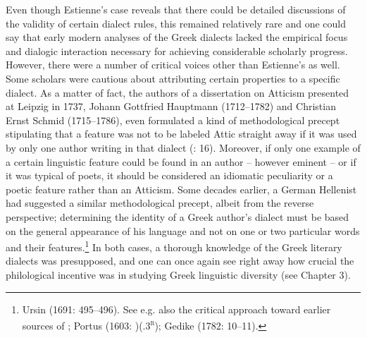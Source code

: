 Even though Estienne’s case reveals that there could be detailed discussions of the validity of certain dialect rules, this remained relatively rare and one could say that early modern analyses of the Greek dialects lacked the empirical focus and dialogic interaction necessary for achieving considerable scholarly progress. However, there were a number of critical voices other than Estienne’s as well. Some scholars were cautious about attributing certain properties to a specific dialect. As a matter of fact, the authors of a dissertation on Atticism presented at Leipzig in 1737, Johann Gottfried Hauptmann (1712–1782) and Christian Ernst Schmid (1715–1786), even formulated a kind of methodological precept stipulating that a feature was not to be labeled Attic straight away if it was used by only one author writing in that dialect (\citealt{HauptmannSchmid1737}: 16). Moreover, if only one example of a certain linguistic feature could be found in an author – however eminent – or if it was typical of poets, it should be considered an idiomatic peculiarity or a poetic feature rather than an Atticism. Some decades earlier, a German Hellenist had suggested a similar methodological precept, albeit from the reverse perspective; determining the identity of a Greek author’s dialect must be based on the general appearance of his language and not on one or two particular words and their features.\footnote{Ursin (1691: 495–496). See e.g. also the critical approach toward earlier sources of \citet{Walper1589}; Portus (1603: )(.3\textsc{\textsuperscript{r}}); Gedike (1782: 10–11).} In both cases, a thorough knowledge of the Greek literary dialects was presupposed, and one can once again see right away how crucial the philological incentive was in studying Greek linguistic diversity (see Chapter 3).

